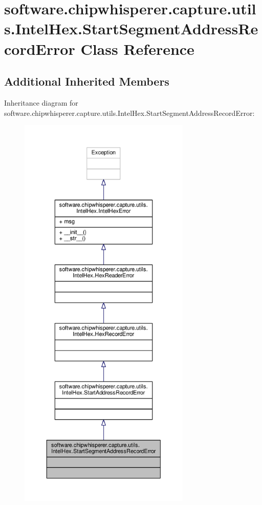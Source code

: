 \hypertarget{classsoftware_1_1chipwhisperer_1_1capture_1_1utils_1_1IntelHex_1_1StartSegmentAddressRecordError}{}\section{software.\+chipwhisperer.\+capture.\+utils.\+Intel\+Hex.\+Start\+Segment\+Address\+Record\+Error Class Reference}
\label{classsoftware_1_1chipwhisperer_1_1capture_1_1utils_1_1IntelHex_1_1StartSegmentAddressRecordError}
\subsection*{Additional Inherited Members}


Inheritance diagram for software.\+chipwhisperer.\+capture.\+utils.\+Intel\+Hex.\+Start\+Segment\+Address\+Record\+Error\+:\nopagebreak
\begin{figure}[H]
\begin{center}
\leavevmode
\includegraphics[height=550pt]{d0/d49/classsoftware_1_1chipwhisperer_1_1capture_1_1utils_1_1IntelHex_1_1StartSegmentAddressRecordError__inherit__graph}
\end{center}
\end{figure}


